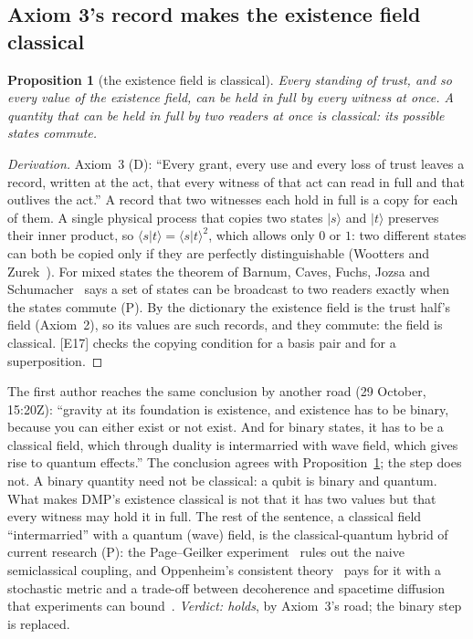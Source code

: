\documentclass[11pt,a4paper]{article}
\newtheorem{proposition}{Proposition}
\theoremstyle{definition}
\theoremstyle{remark}
\newcommand{\chk}[1]{\textsf{[#1]}}
\newcommand{\tagD}{\textsf{(D)}}
\newcommand{\tagP}{\textsf{(P)}}
\begin{document}
\subsection{Axiom 3's record makes the existence field classical}\label{sec:classical}

\begin{proposition}[the existence field is classical]\label{pr:classical}
Every standing of trust, and so every value of the existence field, can be held in full by every witness at once. A quantity that can be
held in full by two readers at once is classical: its possible states commute.
\end{proposition}

\begin{proof}[Derivation]
Axiom~3 \tagD: ``Every grant, every use and every loss of trust leaves a record, written at the act, that every witness of that act can read
in full and that outlives the act.'' A record that two witnesses each hold in full is a copy for each of them. A single physical process
that copies two states $|s\rangle$ and $|t\rangle$ preserves their inner product, so $\langle s|t\rangle=\langle s|t\rangle^2$, which allows
only $0$ or $1$: two different states can both be copied only if they are perfectly distinguishable (Wootters and Zurek~\cite{wz}). For
mixed states the theorem of Barnum, Caves, Fuchs, Jozsa and Schumacher~\cite{barnum} says a set of states can be broadcast to two readers
exactly when the states commute \tagP. By the dictionary the existence field is the trust half's field (Axiom~2), so its values are such
records, and they commute: the field is classical. \chk{E17} checks the copying condition for a basis pair and for a superposition.
\end{proof}

\noindent The first author reaches the same conclusion by another road (29 October, 15:20Z): ``gravity at its foundation is existence, and
existence has to be binary, because you can either exist or not exist. And for binary states, it has to be a classical field, which through
duality is intermarried with wave field, which gives rise to quantum effects.'' The conclusion agrees with Proposition~\ref{pr:classical};
the step does not. A binary quantity need not be classical: a qubit is binary and quantum. What makes DMP's existence classical is not that
it has two values but that every witness may hold it in full. The rest of the sentence, a classical field ``intermarried'' with a quantum
(wave) field, is the classical-quantum hybrid of current research \tagP: the Page--Geilker experiment~\cite{pagegeilker} rules out the
naive semiclassical coupling, and Oppenheim's consistent theory~\cite{oppenheim} pays for it with a stochastic metric and a trade-off
between decoherence and spacetime diffusion that experiments can bound~\cite{osswd}. \emph{Verdict: holds}, by Axiom~3's road; the binary
step is replaced.
\end{document}
